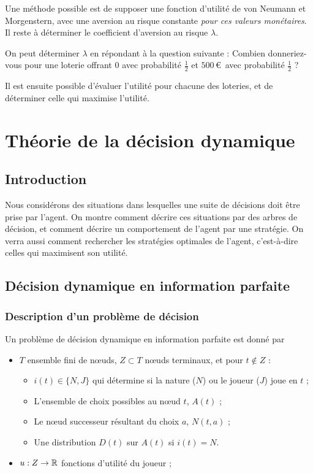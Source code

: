 Une m\'ethode possible est de supposer une fonction d'utilité de
von Neumann et Morgenstern, avec une aversion au risque constante
{\em pour ces valeurs mon\'etaires}. Il reste \`a déterminer le
coefficient d'aversion au risque $\lambda$.

On peut déterminer $\lambda$ en répondant à la question suivante :
Combien donneriez-vous pour une loterie offrant $0$ avec
probabilit\'e $\frac12$ et $500$\,\euro\ avec probabilit\'e
$\frac12$ ?

Il est ensuite possible d'évaluer l'utilité pour chacune des
loteries, et de déterminer celle qui maximise l'utilité.

\chapter{Théorie de la décision dynamique}

\section{Introduction}
Nous considérons des situations dans lesquelles une suite de
décisions doit \^etre prise par l'agent. On montre comment décrire
ces situations par des arbres de décision, et comment décrire un
comportement de l'agent par une stratégie. On verra aussi comment
rechercher les stratégies optimales de l'agent, c'est-à-dire
celles qui maximisent son utilité.

\section{Décision dynamique en information parfaite}

\subsection{Description d'un problème de décision}
Un probl\`eme de décision dynamique en information parfaite est
donné par
\begin{itemize}
\item $T$ ensemble fini de n{\oe}uds, $Z\subset T$ n{\oe}uds
terminaux, et pour $t\not\in Z$ :
\begin{itemize}
\item  $i(t)\in \{N,J\}$ qui détermine si la nature ($N$) ou le
joueur ($J$) joue en $t$ ;%
\item L'ensemble de choix possibles au n{\oe}ud $t$, $A(t)$ ; %
\item Le n{\oe}ud successeur r\'esultant du choix $a$, $N(t,a)$ ;
\item Une distribution $D(t)$ sur $A(t)$ si $i(t)= N$.
\end{itemize}
\item $u:Z\to\mathbb R$ fonctions d'utilit\'e du joueur ;
\end{itemize}

